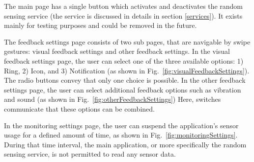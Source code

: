 \documentclass[conference, a4paper, 10pt, twocolumn]{IEEEtran}
\begin{document}
The main page has a single button which activates and deactivates the random sensing service (the service is discussed in details in section \ref{services}). It exists mainly for testing purposes and could be removed in the future.

The feedback settings page consists of two sub pages, that are navigable by swipe gestures: visual feedback settings and other feedback settings. In the visual feedback settings page, the user can select one of the three available options: 1) Ring, 2) Icon, and 3) Notification (as shown in Fig.~\ref{fig:visualFeedbackSettings}). The radio buttons convey that only one choice is possible. In the other feedback settings page, the user can select additional feedback options such as vibration and sound (as shown in Fig.~\ref{fig:otherFeedbackSettings}) Here, switches communicate that these options can be combined.

In the monitoring settings page, the user can suspend the application's sensor usage for a defined amount of time, as shown in Fig.~\ref{fig:monitoringSettings}. During that time interval, the main application, or more specifically the random sensing service, is not permitted to read any sensor data. 
\end{document}

